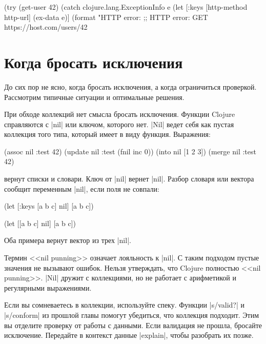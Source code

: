 \begin{english}
  \begin{clojure}
(try
  (get-user 42)
  (catch clojure.lang.ExceptionInfo e
    (let [{:keys [http-method http-url]} (ex-data e)]
      (format "HTTP error: %
;; HTTP error: GET https://host.com/users/42
  \end{clojure}
\end{english}

\section{Когда бросать исключения}

До сих пор не ясно, когда бросать исключения, а когда ограничиться
проверкой. Рассмотрим типичные ситуации и оптимальные решения.

При обходе коллекций нет смысла бросать исключения. Функции Clojure справляются
с \spverb|nil| или ключом, которого нет. \spverb|Nil| ведет себя как пустая
коллекция того типа, который имеет в виду функция. Выражения:

\begin{english}
  \begin{clojure}
(assoc nil :test 42)
(update nil :test (fnil inc 0))
(into nil [1 2 3])
(merge nil {:test 42})
  \end{clojure}
\end{english}

\noindent
вернут списки и словари. Ключ от \spverb|nil| вернет \spverb|nil|. Разбор
словаря или вектора сообщит переменным \spverb|nil|, если поля не совпали:

\begin{english}
  \begin{clojure}
(let [{:keys [a b c]} nil]
  [a b c])

(let [[a b c] nil]
  [a b c])
  \end{clojure}
\end{english}

\noindent
Оба примера вернут вектор из трех \spverb|nil|.

Термин <<nil punning>> означает лояльность к \spverb|nil|. С таким подходом
пустые значения не вызывают ошибок. Нельзя утверждать, что Clojure полностью
<<nil punning>>. \spverb|Nil| дружит с коллекциями, но не работает с арифметикой
и регулярными выражениями.

Если вы сомневаетесь в коллекции, используйте спеку. Функции \spverb|s/valid?| и
\spverb|s/conform| из прошлой главы  помогут убедиться, что
коллекция подходит. Этим вы отделите проверку от работы с данными. Если
валидация не прошла, бросайте исключение. Передайте в контекст данные
\spverb|explain|, чтобы разобрать их позже.

